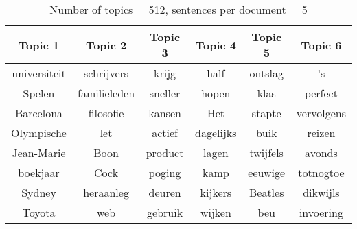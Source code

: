 \begin{table}[H]
\centering
\caption[Number of topics = 512, sentences per document = 5]{Number of topics = 512, sentences per document = 5}
\label{tab:topics_512_5}
\begin{tabular}{|c|c|c|c|c|c|}
\hline
Topic 1 & Topic 2 & Topic 3 & Topic 4 & Topic 5 & Topic 6 \\ \hline \hline
universiteit & schrijvers & krijg & half & ontslag & 's\\
Spelen & familieleden & sneller & hopen & klas & perfect\\
Barcelona & filosofie & kansen & Het & stapte & vervolgens\\
Olympische & let & actief & dagelijks & buik & reizen\\
Jean-Marie & Boon & product & lagen & twijfels & avonds\\
boekjaar & Cock & poging & kamp & eeuwige & totnogtoe\\
Sydney & heraanleg & deuren & kijkers & Beatles & dikwijls\\
Toyota & web & gebruik & wijken & beu & invoering\\
\hline
\end{tabular}
\end{table}
